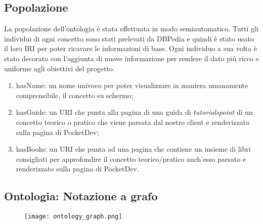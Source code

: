 \subsection{Popolazione}
La popolazione dell'ontologia è stata effettuata in modo semiautomatico. Tutti gli individui di ogni concetto sono stati prelevati da DBPedia e quindi è stato usato il loro IRI per poter ricavare le informazioni di base. Ogni individuo a sua volta è stato decorato con l'aggiunta di nuove informazione per rendere il dato più ricco e uniforme agli obiettivi del progetto. 
\begin{enumerate}
 \item hasName: un nome univoco per poter visualizzare in maniera umanamente comprensibile, il concetto su schermo;
 \item hasGuide: un URI che punta alla pagina di una guida di \textit{tutorialspoint} di un concetto teorico o pratico che viene  parsata dal nostro client e renderizzata sulla pagina di PocketDev;
 \item hasBooks: un URI che punta ad una pagina che contiene un insieme di libri consigliati per approfondire il concetto teorico/pratico anch'esso parsato e renderizzato sulla pagina di PocketDev.
\end{enumerate}
\subsection{Ontologia: Notazione a grafo}
\begin{figure}[H]
 \texttt{[image: ontology\_graph.png]}
\end{figure}
